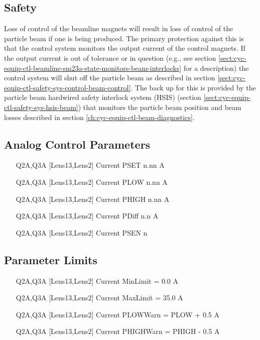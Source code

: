 \documentclass[11pt]{book}		%
\begin{document}
\subsection{Safety}\label{sect:cyc-op-interface-status-beamline-tofc1-safety}

Loss of control of the beamline magnets will result in loss of control of the particle beam if one is being produced.  The primary protection against this is that the control system monitors the output current of the control magnets.  If the output current is out of tolerance or in question (e.g., see section \ref{sect:cyc-equip-ctl-beamline-sm23a-state-monitors-beam-interlocks} for a description) the control system will shut off the particle beam as described in section \ref{sect:cyc-equip-ctl-safety-sys-control-beam-control}.  The back up for this is provided by the particle beam hardwired safety interlock system (HSIS) (section \ref{sect:cyc-equip-ctl-safety-sys-hsis-beam}) that monitors the particle beam position and beam losses described in section \ref{ch:cyc-equip-ctl-beam-diagnostics}.

\subsection{Analog Control Parameters}\label{sect:cyc-op-interface-status-beamline-tofc1-analog-control}


\begin{enumerate}
 \item [Q2A,Q3A] [Lens13,Lens2] Current PSET  n.nn A
 \item [Q2A,Q3A] [Lens13,Lens2] Current PLOW  n.nn A
 \item [Q2A,Q3A] [Lens13,Lens2] Current PHIGH n.nn A
 \item [Q2A,Q3A] [Lens13,Lens2] Current PDiff n.n A
 \item [Q2A,Q3A] [Lens13,Lens2] Current PSEN  n
\end{enumerate}

\subsection{Parameter Limits} \label{sect:cyc-op-interface-status-beamline-tofc1-analog-control-limits}

\begin{enumerate}
 \item [Q2A,Q3A] [Lens13,Lens2] Current MinLimit = 0.0 A
 \item [Q2A,Q3A] [Lens13,Lens2] Current MaxLimit = 35.0 A
 \item [Q2A,Q3A] [Lens13,Lens2] Current PLOWWarn = PLOW + 0.5 A
 \item [Q2A,Q3A] [Lens13,Lens2] Current PHIGHWarn = PHIGH - 0.5 A
\end{enumerate}
\end{document}

